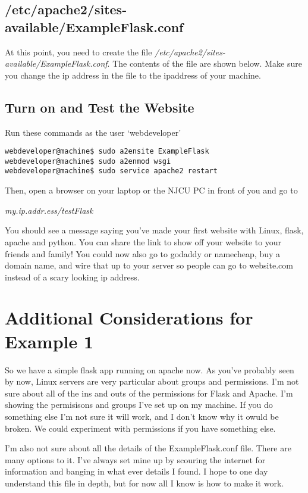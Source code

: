 \documentclass[10pt]{article}
\begin{document}
\subsection{/etc/apache2/sites-available/ExampleFlask.conf}
At this point, you need to create the file
\textit{/etc/apache2/sites-available/ExampleFlask.conf}. The contents of the
file are shown below. Make sure you change the ip address in the file to the
ipaddress of your machine. 



\subsection{Turn on and Test the Website}
Run these commands as the user `webdeveloper'
\begin{lstlisting}
webdeveloper@machine$ sudo a2ensite ExampleFlask
webdeveloper@machine$ sudo a2enmod wsgi
webdeveloper@machine$ sudo service apache2 restart
\end{lstlisting}

Then, open a browser on your laptop or the NJCU PC in front of you and go to 

\begin{center}
\textit{my.ip.addr.ess/testFlask}
\end{center}

You should see a message saying you've made your first website with Linux, flask, apache and python. You can share the link to show off your website to your friends and family! You could now also go to godaddy or namecheap, buy a domain name, and wire that up to your server so people can go to website.com instead of a scary looking ip address.

\section{Additional Considerations for Example 1}
So we have a simple flask app running on apache now. As you've probably seen by now, Linux servers are very particular about groups and permissions. I'm not sure about all of the ins and outs of the permissions for Flask and Apache. I'm showing the permisisons and groups I've set up on my machine. If you do something else I'm not sure it will work, and I don't know why it owuld be broken. We could experiment with permissions if you have something else.


I'm also not sure about all the details of the ExampleFlask.conf file. There are many options to it. I've always set mine up by scouring the internet for information and banging in what ever details I found. I hope to one day understand this file in depth, but for now all I know is how to make it work.
\end{document}
